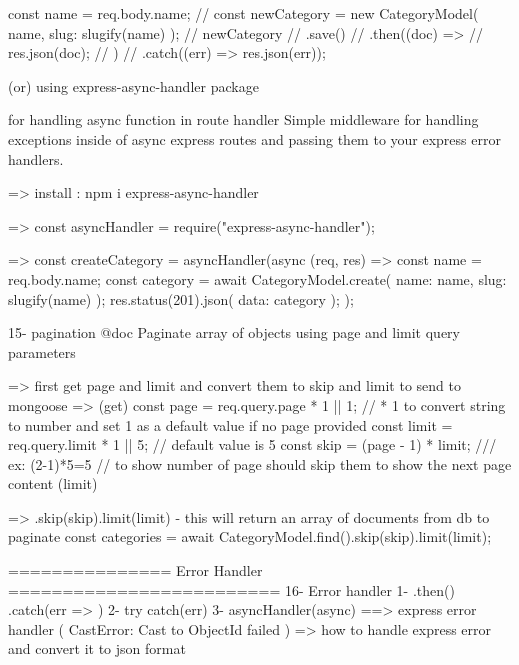        
                 const name = req.body.name;
            //   const newCategory = new CategoryModel({ name, slug: slugify(name) });
            //   newCategory
            //     .save()
            //     .then((doc) => {
            //       res.json(doc);
            //     })
            //     .catch((err) => res.json(err));



        (or)  using express-async-handler package

            for handling  async function in route handler
            Simple middleware for handling exceptions inside of async express routes and passing them to your express error handlers.
             
            => install : npm i express-async-handler

            => const asyncHandler = require("express-async-handler");
                
            => const createCategory = asyncHandler(async (req, res) => {
                    const name = req.body.name;
                    const category = await CategoryModel.create({ name: name, slug: slugify(name) });
                    res.status(201).json({ data: category });
                });


15- pagination
    @doc Paginate array of objects using page and limit query parameters
    
        => first get page and limit and convert them to skip and limit to send  to mongoose
        => (get)
                  const page = req.query.page * 1 || 1; // * 1 to convert string to number and set 1 as a  default value if no page provided
                  const limit = req.query.limit * 1 || 5;    // default value is 5
                  const skip = (page - 1) * limit; /// ex: (2-1)*5=5  // to show number of page should skip them to  show the next page content (limit)

        => .skip(skip).limit(limit)   - this will return an array of documents from db
            to paginate   
            const categories = await CategoryModel.find({}).skip(skip).limit(limit);




=============== Error Handler =========================
16- Error handler
    1- .then() .catch(err => )
    2- try{} catch(err){}
    3- asyncHandler(async) ==> express error handler ( CastError: Cast to ObjectId failed )
      => how to handle express error and convert it to json format

